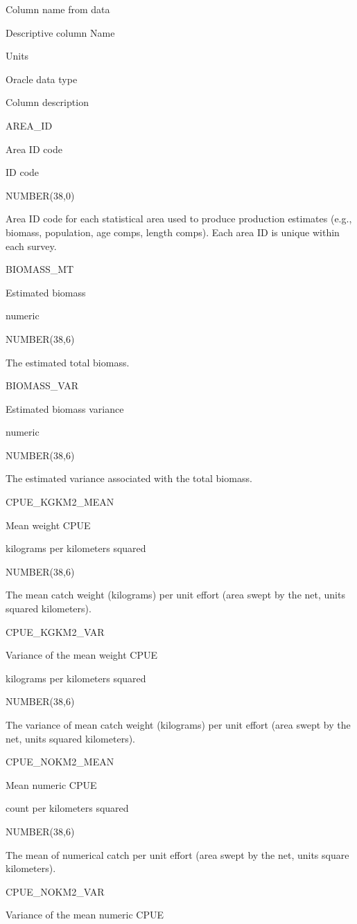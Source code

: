 \documentclass[
  letterpaper,
  oneside,
  open=any]{scrbook}
\begin{document}
Column name from data

Descriptive column Name

Units

Oracle data type

Column description

AREA\_ID

Area ID code

ID code

NUMBER(38,0)

Area ID code for each statistical area used to produce production
estimates (e.g., biomass, population, age comps, length comps). Each
area ID is unique within each survey.

BIOMASS\_MT

Estimated biomass

numeric

NUMBER(38,6)

The estimated total biomass.

BIOMASS\_VAR

Estimated biomass variance

numeric

NUMBER(38,6)

The estimated variance associated with the total biomass.

CPUE\_KGKM2\_MEAN

Mean weight CPUE

kilograms per kilometers squared

NUMBER(38,6)

The mean catch weight (kilograms) per unit effort (area swept by the
net, units squared kilometers).

CPUE\_KGKM2\_VAR

Variance of the mean weight CPUE

kilograms per kilometers squared

NUMBER(38,6)

The variance of mean catch weight (kilograms) per unit effort (area
swept by the net, units squared kilometers).

CPUE\_NOKM2\_MEAN

Mean numeric CPUE

count per kilometers squared

NUMBER(38,6)

The mean of numerical catch per unit effort (area swept by the net,
units square kilometers).

CPUE\_NOKM2\_VAR

Variance of the mean numeric CPUE
\end{document}
